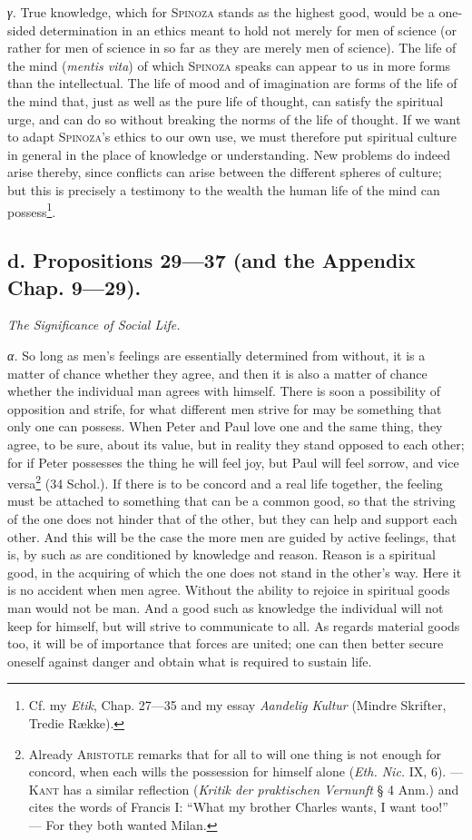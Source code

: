 \documentclass[12pt]{article}
\begin{document}
\textit{γ.} True knowledge, which for \textsc{Spinoza} stands as the highest good, would be a
one-sided determination in an ethics meant to hold not merely for men of science (or rather for
men of science in so far as they are merely men of science). The life of the mind (\textit{mentis
vita}) of which \textsc{Spinoza} speaks can appear to us in more forms than the intellectual. The
life of mood and of imagination are forms of the life of the mind that, just as well as the pure
life of thought, can satisfy the spiritual urge, and can do so without breaking the norms of the
life of thought. If we want to adapt \textsc{Spinoza}'s ethics to our own use, we must therefore
put spiritual culture in general in the place of knowledge or understanding. New problems do indeed
arise thereby, since conflicts can arise between the different spheres of culture; but this is
precisely a testimony to the wealth the human life of the mind can possess\footnote{Cf. my
\textit{Etik}, Chap. 27---35 and my essay \textit{Aandelig Kultur} (Mindre Skrifter, Tredie
Række).}.

\subsection*{d. Propositions 29---37 (and the Appendix Chap. 9---29).}
\begin{center}\textit{The Significance of Social Life.}\end{center}

\textit{α.} So long as men's feelings are essentially determined from without, it is a matter of
chance whether they agree, and then it is also a matter of chance whether the individual man agrees
with himself. There is soon a possibility of opposition and strife, for what different men strive
for may be something that only one can possess. When Peter and Paul love one and the same thing,
they agree, to be sure, about its value, but in reality they stand opposed to each other; for if
Peter possesses the thing he will feel joy, but Paul will feel sorrow, and vice
versa\footnote{Already \textsc{Aristotle} remarks that for all to will one thing is not enough for
concord, when each wills the possession for himself alone (\textit{Eth. Nic.} IX, 6). ---
\textsc{Kant} has a similar reflection (\textit{Kritik der praktischen Vernunft} § 4 Anm.) and
cites the words of Francis I: ``What my brother Charles wants, I want too!'' --- For they both
wanted Milan.} (34 Schol.). If there is to be concord and a real life together, the feeling must
be attached to something that can be a common good, so that the striving of the one does not
hinder that of the other, but they can help and support each other. And this will be the case the
more men are guided by active feelings, that is, by such as are conditioned by knowledge and
reason. Reason is a spiritual good, in the acquiring of which the one does not stand in the other's
way. Here it is no accident when men agree. Without the ability to rejoice in spiritual goods man
would not be man. And a good such as knowledge the individual will not keep for himself, but will
strive to communicate to all. As regards material goods too, it will be of importance that forces
are united; one can then better secure oneself against danger and obtain what is required to
sustain life.
\end{document}
